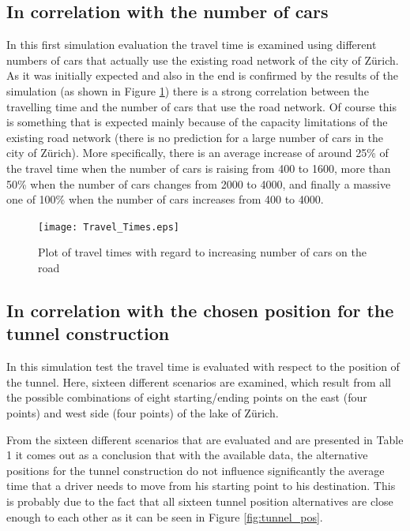 \documentclass[11pt]{article}
\begin{document}
\subsection{In correlation with the number of cars}
In this first simulation evaluation the travel time is examined using different numbers of cars that actually use the existing road network of the city of Z\"urich. As it was initially expected and also in the end is confirmed by the results of the simulation (as shown in Figure \ref{fig:travel_times}) there is a strong correlation between the travelling time and the number of cars that use the road network. Of course this is something that is expected mainly because of the capacity limitations of the existing road network (there is no prediction for a large number of cars in the city of Z\"urich). More specifically, there is an average increase of around 25\% of the travel time when the number of cars is raising from 400 to 1600, more than 50\% when the number of cars changes from 2000 to 4000, and finally a massive one of 100\% when the number of cars increases from 400 to 4000.
\begin{figure}[tb]
	\begin{center}
		\texttt{[image: Travel\_Times.eps]}
	\end{center}
	\caption{Plot of travel times with regard to increasing number of cars on the road}
	\label{fig:travel_times}
\end{figure}

\subsection{In correlation with the chosen position for the tunnel construction}
In this simulation test the travel time is evaluated with respect to the position of the tunnel. Here, sixteen different scenarios are examined, which result from all the possible combinations of eight starting/ending points on the east (four points) and west side (four points) of the lake of Z\"urich.

From the sixteen different scenarios that are evaluated and are presented in Table 1 it comes out as a conclusion that with the available data, the alternative positions for the tunnel construction do not influence significantly the average time that a driver needs to move from his starting point to his destination. This is probably due to the fact that all sixteen tunnel position alternatives are close enough to each other as it can be seen in Figure \ref{fig:tunnel_pos}.
\end{document}
